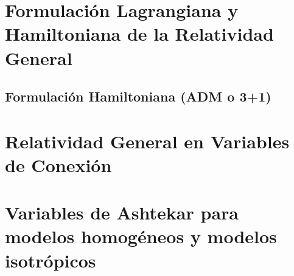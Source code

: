 \documentclass[10pt, letterpaper, spanish]{book}
\theoremstyle{definition}
\theoremstyle{plain}
\theoremstyle{remark}
\theoremstyle{break}
\begin{document}

\chapter{Formulaci\'{o}n Lagrangiana y Hamiltoniana de la Relatividad General}
\label{chp:RG}




\section{Formulaci\'{o}n Hamiltoniana (ADM o 3+1)}









\chapter{Relatividad General en Variables de Conexi\'{o}n}






\chapter{Variables de Ashtekar para modelos homog\'{e}neos y modelos isotr\'{o}picos}



\end{document}
